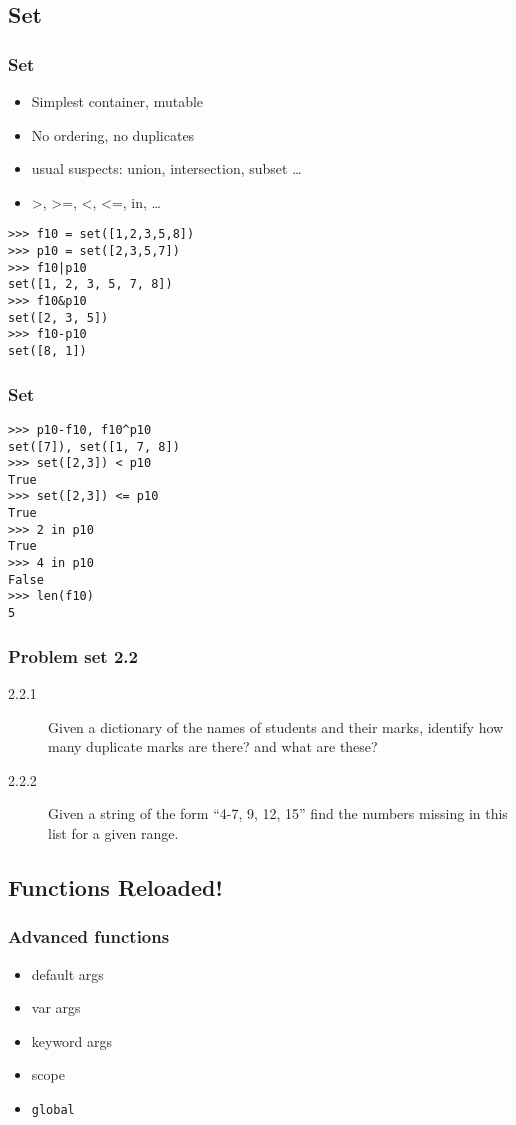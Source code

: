 \documentclass[14pt,compress]{beamer}
\newcounter{time}
\newcommand{\inctime}[1]{\addtocounter{time}{#1}{\tiny \thetime\ m}}
\newcommand{\typ}[1]{\texttt{#1}}
\begin{document}
\subsection{Set}
\begin{frame}[fragile]
  \frametitle{Set}
    \begin{itemize}
      \item Simplest container, mutable
      \item No ordering, no duplicates
      \item usual suspects: union, intersection, subset \ldots
      \item >, >=, <, <=, in, \ldots
    \end{itemize}
    \begin{lstlisting}
>>> f10 = set([1,2,3,5,8])
>>> p10 = set([2,3,5,7])
>>> f10|p10
set([1, 2, 3, 5, 7, 8])
>>> f10&p10
set([2, 3, 5])
>>> f10-p10
set([8, 1])
\end{lstlisting}
\end{frame}

\begin{frame}[fragile]
  \frametitle{Set}
    \begin{lstlisting}
>>> p10-f10, f10^p10
set([7]), set([1, 7, 8])
>>> set([2,3]) < p10
True
>>> set([2,3]) <= p10
True
>>> 2 in p10
True
>>> 4 in p10
False
>>> len(f10)
5
\end{lstlisting}
\end{frame}


\begin{frame}
  \frametitle{Problem set 2.2}
  \begin{description}
    \item[2.2.1] Given a dictionary of the names of students and their marks, identify how many duplicate marks are there? and what are these?
    \item[2.2.2] Given a string of the form ``4-7, 9, 12, 15'' find the numbers missing in this list for a given range.
\end{description}
\inctime{15}
\end{frame}

\subsection{Functions Reloaded!}
\begin{frame}[fragile]
    \frametitle{Advanced functions}
    \begin{itemize}
        \item default args
        \item var args
        \item keyword args
        \item scope
        \item \typ{global}
      \end{itemize}
\end{frame}
\end{document}
